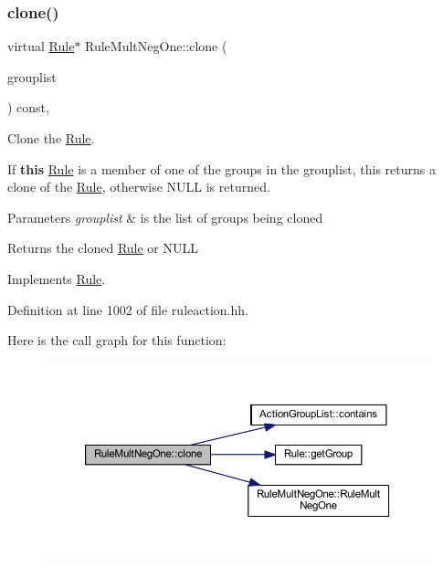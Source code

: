 \subsubsection{\texorpdfstring{clone()}{clone()}}
{\footnotesize\ttfamily virtual \mbox{\hyperlink{class_rule}{Rule}}$\ast$ Rule\+Mult\+Neg\+One\+::clone (\begin{DoxyParamCaption}\item[{const \mbox{\hyperlink{class_action_group_list}{Action\+Group\+List}} \&}]{grouplist }\end{DoxyParamCaption}) const\hspace{0.3cm}{\ttfamily [inline]}, {\ttfamily [virtual]}}



Clone the \mbox{\hyperlink{class_rule}{Rule}}. 

If {\bfseries{this}} \mbox{\hyperlink{class_rule}{Rule}} is a member of one of the groups in the grouplist, this returns a clone of the \mbox{\hyperlink{class_rule}{Rule}}, otherwise N\+U\+LL is returned. 
\begin{DoxyParams}{Parameters}
{\em grouplist} & is the list of groups being cloned \\
\hline
\end{DoxyParams}
\begin{DoxyReturn}{Returns}
the cloned \mbox{\hyperlink{class_rule}{Rule}} or N\+U\+LL 
\end{DoxyReturn}


Implements \mbox{\hyperlink{class_rule_a70de90a76461bfa7ea0b575ce3c11e4d}{Rule}}.



Definition at line 1002 of file ruleaction.\+hh.

Here is the call graph for this function\+:
\nopagebreak
\begin{figure}[H]
\begin{center}
\leavevmode
\includegraphics[width=350pt]{class_rule_mult_neg_one_a0d2b0402af95e0c0c3966213a5248581_cgraph}
\end{center}
\end{figure}
\mbox{\label{class_rule_mult_neg_one_af6cff79cf3a0353b28ffede568a34ad5}} 
